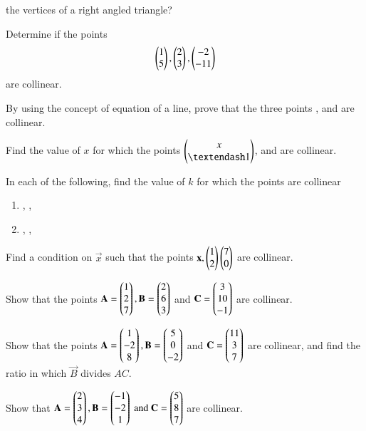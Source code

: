 %
the vertices of a right angled triangle?
\item Determine if the points 
\begin{align}
\begin{pmatrix}1\\5\end{pmatrix}, \begin{pmatrix}2\\3\end{pmatrix}, \begin{pmatrix}-2\\-11\end{pmatrix}
\end{align}
%
are collinear.	
\item By using the concept of equation of a line, prove that the three points ,  and  are collinear.
\item Find the value of $x$ for which the points $\myvec{x\\ – 1}$,  and  are collinear.
\item  In each of the following, find the value of $k$ for which the points are collinear

\begin{enumerate}
\item {},  ,   
\item {},  ,   
\end{enumerate}
\item Find a condition on $\vec{x}$  such that the points $\mathbf{x}, \begin{pmatrix}1\\2\end{pmatrix}\begin{pmatrix}7\\0\end{pmatrix}$ are collinear.
\item Show that the points 
$\mathbf{A}=\begin{pmatrix}1\\2\\7\end{pmatrix}, \mathbf{B}=\begin{pmatrix}2\\6\\3\end{pmatrix}$ and $ \mathbf{C}=\begin{pmatrix}3\\10\\-1\end{pmatrix}$ are collinear.
\item Show that the points 
$\mathbf{A}=\begin{pmatrix}1\\-2\\8\end{pmatrix}, \mathbf{B}=\begin{pmatrix}5\\0\\-2\end{pmatrix}$ and $ \mathbf{C}=\begin{pmatrix}11\\3\\7\end{pmatrix}$ are collinear, and find the ratio in which $\vec{B}$ divides $AC$.
\item Show that 
$
\mathbf{A}=\begin{pmatrix}2\\3\\4\end{pmatrix}, 
\mathbf{B}=\begin{pmatrix}-1\\-2\\1\end{pmatrix} \text{ and } 
\mathbf{C}=\begin{pmatrix}5\\8\\7\end{pmatrix}$  
are collinear.

